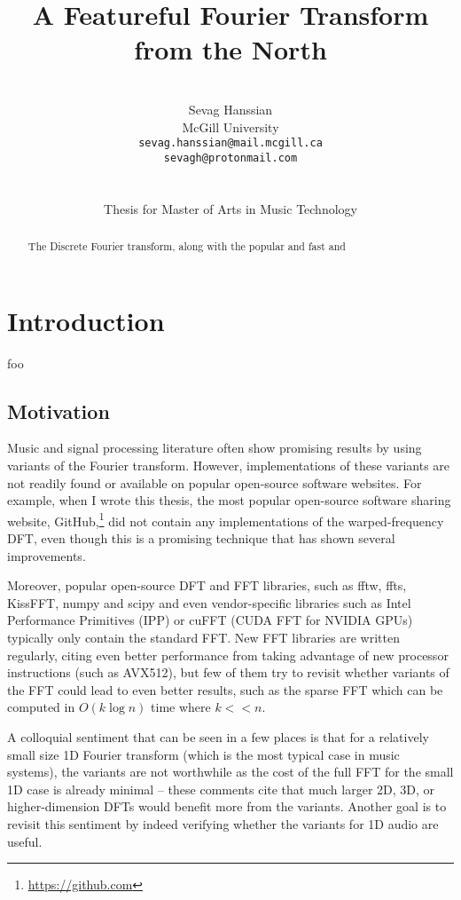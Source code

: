 \documentclass[letter,12pt]{article}
\title{A Featureful Fourier Transform from the North}
\author{\vspace{2em}\\Sevag Hanssian \\
  McGill University \\
 \texttt{sevag.hanssian@mail.mcgill.ca} \\
 \texttt{sevagh@protonmail.com} \\\ \\\ \\
 Thesis for Master of Arts in Music Technology}
\date{}
\begin{document}
\maketitle

\vfill
\clearpage %

\tableofcontents

\vfill
\clearpage %

\listoffigures

\listoflistings

\vfill
\clearpage %

\begin{abstract}
	The Discrete Fourier transform, along with the popular and fast and 
\end{abstract}

\section{Introduction}
\label{sec:intro}

foo

\subsection{Motivation}

Music and signal processing literature often show promising results by using variants of the Fourier transform. However, implementations of these variants are not readily found or available on popular open-source software websites. For example, when I wrote this thesis, the most popular open-source software sharing website, GitHub,\footnote{\href{https://github.com}{https://github.com}} did not contain any implementations of the warped-frequency DFT, even though this is a promising technique that has shown several improvements.

Moreover, popular open-source DFT and FFT libraries, such as fftw, ffts, KissFFT, numpy and scipy and even vendor-specific libraries such as Intel Performance Primitives (IPP) or cuFFT (CUDA FFT for NVIDIA GPUs) typically only contain the standard FFT. New FFT libraries are written regularly, citing even better performance from taking advantage of new processor instructions (such as AVX512), but few of them try to revisit whether variants of the FFT could lead to even better results, such as the sparse FFT which can be computed in  $O(k \log n)$ time where $k << n$.

A colloquial sentiment that can be seen in a few places is that for a relatively small size 1D Fourier transform (which is the most typical case in music systems), the variants are not worthwhile as the cost of the full FFT for the small 1D case is already minimal  -- these comments cite that much larger 2D, 3D, or higher-dimension DFTs would benefit more from the variants. Another goal is to revisit this sentiment by indeed verifying whether the variants for 1D audio are useful.
\end{document}
